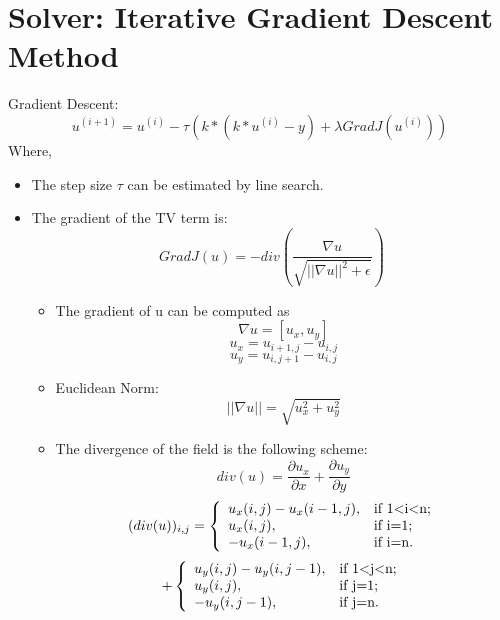 \documentclass[paper=a4, fontsize=11pt]{scrartcl}
\begin{document}
\section{Solver: Iterative Gradient Descent Method}
Gradient Descent:
\begin{equation}
u^{(i+1)}= u^{(i)}-\tau \left(k \ast (k \ast u^{(i)}-y)+\lambda Grad J(u^{(i)})\right)
\end{equation}
Where,
\begin{itemize}
  \item The step size $\tau$ can be estimated by line search.
  \item The gradient of the TV term is:
\begin{equation}
Grad J(u)=-div \left(\frac{\nabla u}{\sqrt{||\nabla u||^2+\epsilon}}\right)
\end{equation}
\begin{itemize}
  \item The gradient of u can be computed as
\begin{equation}
\nabla u = [u_x, u_y]
\end{equation}
\begin{equation*}
u_x=u_{i+1,j}-u_{i,j}
\end{equation*}
\begin{equation*}
u_y=u_{i,j+1}-u_{i,j}
\end{equation*}
  \item Euclidean Norm:
\begin{equation}
||\nabla u ||=\sqrt{u_x^2+u_y^2}
\end{equation}
  \item The divergence of the field is the following scheme:
\begin{equation}
div(u)=\frac{\partial u_x}{\partial x}+\frac{\partial u_y}{\partial y}
\end{equation}
\begin{equation*}
(div(u))_{i,j}=
\left\{
  \begin{array}{ll}
    u_x(i,j)-u_x(i-1,j), & \hbox{if 1$<$i$<$n;} \\
    u_x(i,j), & \hbox{if i=1;} \\
    -u_x(i-1,j), & \hbox{if i=n.}
  \end{array}
\right.
\end{equation*}
\begin{equation*}
+
\left\{
  \begin{array}{ll}
    u_y(i,j)-u_y(i,j-1), & \hbox{if 1$<$j$<$n;} \\
    u_y(i,j), & \hbox{if j=1;} \\
    -u_y(i,j-1), & \hbox{if j=n.}
  \end{array}
\right.
\end{equation*}
\end{itemize}
\end{itemize}
\end{document}
